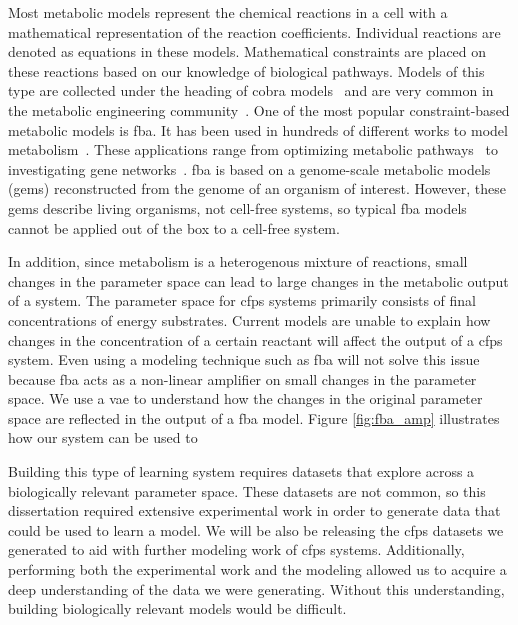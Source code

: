 Most metabolic models represent the chemical reactions in a cell with a mathematical representation of the reaction coefficients.
Individual reactions are denoted as equations in these models.
Mathematical constraints are placed on these reactions based on our knowledge of biological pathways.
Models of this type are collected under the heading of \gls{cobra} models~\cite{schellenberger2011quantitative} and are very common in the metabolic engineering community~\cite{orth2010flux}.
One of the most popular constraint-based metabolic models is \gls{fba}.
It has been used in hundreds of different works to model metabolism~\cite{feist2008growing}.
These applications range from optimizing metabolic pathways~\cite{almaas2004global} to investigating gene networks~\cite{shlomi2007genome}.
\gls{fba} is based on a genome-scale metabolic models (\glspl{gem}) reconstructed from the genome of an organism of interest.
However, these \glspl{gem} describe living organisms, not cell-free systems, so typical \gls{fba} models cannot be applied out of the box to a cell-free system.

In addition, since metabolism is a heterogenous mixture of reactions, small changes in the parameter space can lead to large changes in the metabolic output of a system.
The parameter space for \gls{cfps} systems primarily consists of final concentrations of energy substrates.
Current models are unable to explain how changes in the concentration of a certain reactant will affect the output of a \gls{cfps} system.
Even using a modeling technique such as \gls{fba} will not solve this issue because \gls{fba} acts as a non-linear amplifier on small changes in the parameter space.
We use a \gls{vae} to understand how the changes in the original parameter space are reflected in the output of a \gls{fba} model.
Figure \ref{fig:fba_amp} illustrates how our system can be used to 

Building this type of learning system requires datasets that explore across a biologically relevant parameter space.
These datasets are not common, so this dissertation required extensive experimental work in order to generate data that could be used to learn a model.
We will be also be releasing the \gls{cfps} datasets we generated to aid with further modeling work of \gls{cfps} systems.
Additionally, performing both the experimental work and the modeling allowed us to acquire a deep understanding of the data we were generating.
Without this understanding, building biologically relevant models would be difficult.

